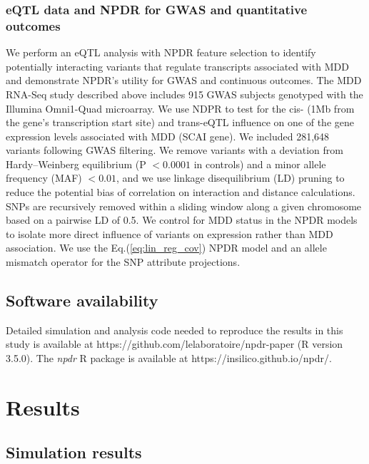 \documentclass{bioinfo}
\begin{document}
\subsubsection{eQTL data and NPDR for GWAS and quantitative outcomes}
We perform an eQTL analysis with NPDR feature selection to identify potentially interacting variants that regulate transcripts associated with MDD and demonstrate NPDR's utility for GWAS and continuous outcomes.
The MDD RNA-Seq study described above includes 915 GWAS subjects genotyped with the Illumina Omni1-Quad microarray\cite{mostafavi14}.
We use NDPR to test for the cis- (1Mb from the gene's transcription start site) and trans-eQTL influence on one of the gene expression levels associated with MDD (SCAI gene).
We included 281,648 variants following GWAS filtering.
We remove variants with a deviation from Hardy–Weinberg equilibrium (P $<0.0001$ in controls) and a minor allele frequency (MAF) $<0.01$, and we use linkage disequilibrium (LD) pruning to reduce the potential bias of correlation on interaction and distance calculations.
SNPs are recursively removed within a sliding window along a given chromosome based on a pairwise LD of 0.5.
We control for MDD status in the NPDR models to isolate more direct influence of variants on expression rather than MDD association. We use the Eq.(\ref{eq:lin_reg_cov}) NPDR model and an allele mismatch operator for the SNP attribute projections\cite{titv}. 


\subsection{Software availability}
Detailed simulation and analysis code needed to reproduce the results in this study is available at {{https://github.com/lelaboratoire/npdr-paper}} (R version 3.5.0).
The \emph{npdr} R package is available at {{https://insilico.github.io/npdr/}}.


\section{Results}
\subsection{Simulation results} 
\end{document}
